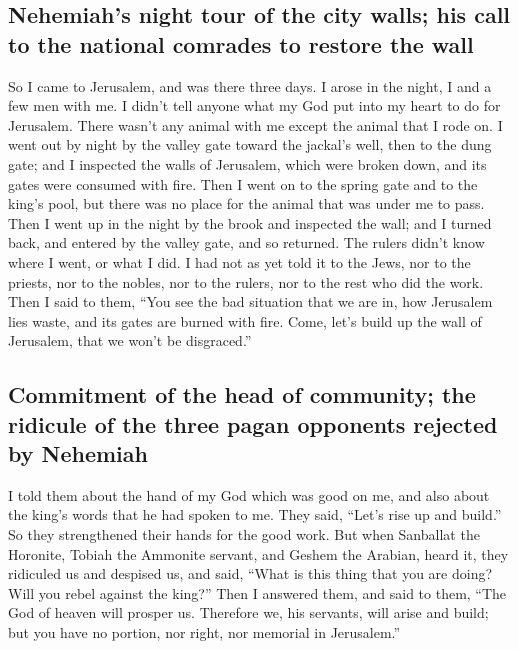 \begin{paracol}{2}
\begin{otherlanguage}{english}
\hypertarget{nehemiahs-night-tour-of-the-city-walls-his-call-to-the-national-comrades-to-restore-the-wall}{%
\subsection{Nehemiah's night tour of the city walls; his call to the
national comrades to restore the
wall}\label{nehemiahs-night-tour-of-the-city-walls-his-call-to-the-national-comrades-to-restore-the-wall}}

 So I came to Jerusalem, and was there three days.
 I arose in the night, I and a few men with me. I didn't
tell anyone what my God put into my heart to do for Jerusalem. There
wasn't any animal with me except the animal that I rode on.
 I went out by night by the valley gate toward the
jackal's well, then to the dung gate; and I inspected the walls of
Jerusalem, which were broken down, and its gates were consumed with
fire.  Then I went on to the spring gate and to the
king's pool, but there was no place for the animal that was under me to
pass.  Then I went up in the night by the brook and
inspected the wall; and I turned back, and entered by the valley gate,
and so returned.  The rulers didn't know where I went, or
what I did. I had not as yet told it to the Jews, nor to the priests,
nor to the nobles, nor to the rulers, nor to the rest who did the work.
 Then I said to them, ``You see the bad situation that we
are in, how Jerusalem lies waste, and its gates are burned with fire.
Come, let's build up the wall of Jerusalem, that we won't be
disgraced.''

\hypertarget{commitment-of-the-head-of-community-the-ridicule-of-the-three-pagan-opponents-rejected-by-nehemiah}{%
\subsection{Commitment of the head of community; the ridicule of the
three pagan opponents rejected by
Nehemiah}\label{commitment-of-the-head-of-community-the-ridicule-of-the-three-pagan-opponents-rejected-by-nehemiah}}

 I told them about the hand of my God which was good on
me, and also about the king's words that he had spoken to me. They said,
``Let's rise up and build.'' So they strengthened their hands for the
good work.  But when Sanballat the Horonite, Tobiah the
Ammonite servant, and Geshem the Arabian, heard it, they ridiculed us
and despised us, and said, ``What is this thing that you are doing? Will
you rebel against the king?''  Then I answered them, and
said to them, ``The God of heaven will prosper us. Therefore we, his
servants, will arise and build; but you have no portion, nor right, nor
memorial in Jerusalem.''


\end{otherlanguage}
\end{paracol}
